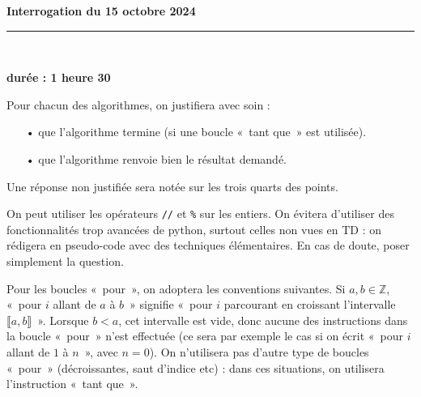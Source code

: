 \documentclass[11pt,a4paper]{article}
\title{}
\date{}
\newcommand{\HRule}{\rule{\linewidth}{0.5mm}}
\begin{document}
\pagestyle{fancy}

\fancyhead{}
 \fancyfoot{}


\newcommand{\lb}{\llbracket}
\newcommand{\rb}{\rrbracket}
\newcommand{\N}{\mathbb{N}}
\newcommand{\Z}{\mathbb{Z}}
\newcommand{\R}{\mathbb{R}}




\newcommand{\md}[3]{#1\ \equiv \ #2 \! \! \! \! \! \pmod {#3} }
\newcommand{\nmd}[3]{#1 \not \equiv #2 \! \! \! \! \!  \pmod {#3} }
\newcommand{\mda}[3]{#1 \equiv #2 \! \!  \pmod {#3} }
\newcommand{\nmda}[3]{#1 \not \equiv #2 \! \! \pmod {#3} }
\newcommand{\mo}[2]{#1 \! \! \! \! \! \pmod #2 }
\newcommand{\moa}[2]{#1 \! \!  \pmod {#2} }

\thispagestyle{fancy}

\begin{center}
    { \huge \bfseries
Interrogation du 15 octobre 2024
     \\ [0cm] }
    \HRule \\[0.5cm]
\end{center}

\begin{center}
\textbf{durée : 1 heure 30}
\end{center}



Pour chacun des algorithmes, on justifiera avec soin : \begin{itemize}
\item[•] que l'algorithme termine (si une boucle «~tant que~» est utilisée).

\item[•] que l'algorithme renvoie bien le résultat demandé.
\end{itemize}

Une réponse non justifiée sera notée sur les trois quarts des points.

On peut utiliser les opérateurs \verb+//+ et \verb+%+ sur les entiers. On évitera d'utiliser des fonctionnalités trop avancées de python, surtout celles non vues en TD : on rédigera en pseudo-code avec des techniques élémentaires. En cas de doute, poser simplement la question.




\bigskip

Pour les boucles «~pour~», on adoptera les conventions suivantes. Si $a,b\in \Z$, «~pour $i$ allant de $a$ à $b$~» signifie «~pour $i$ parcourant en croissant l'intervalle $\llbracket a,b\rrbracket$~». Lorsque $b<a$, cet intervalle est vide, donc aucune des instructions dans la boucle «~pour~» n'est effectuée (ce sera par exemple le cas si on écrit «~pour $i$ allant de $1$ à $n$~», avec $n=0$). On n'utilisera pas d'autre type de boucles «~pour~» (décroissantes, saut d'indice etc) : dans ces situations, on utilisera l'instruction «~tant que~».
\end{document}
